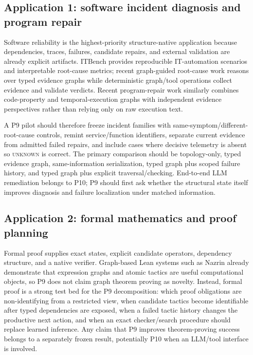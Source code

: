 \subsection{Application 1: software incident diagnosis and program repair}

Software reliability is the highest-priority structure-native application because dependencies, traces, failures, candidate repairs, and external validation are already explicit artifacts. ITBench provides reproducible IT-automation scenarios and interpretable root-cause metrics; recent graph-guided root-cause work reasons over typed evidence graphs while deterministic graph/tool operations collect evidence and validate verdicts. Recent program-repair work similarly combines code-property and temporal-execution graphs with independent evidence perspectives rather than relying only on raw execution text.

A P9 pilot should therefore freeze incident families with same-symptom/different-root-cause controls, remint service/function identifiers, separate current evidence from admitted failed repairs, and include cases where decisive telemetry is absent so \textsc{unknown} is correct. The primary comparison should be topology-only, typed evidence graph, same-information serialization, typed graph plus scoped failure history, and typed graph plus explicit traversal/checking. End-to-end LLM remediation belongs to P10; P9 should first ask whether the structural state itself improves diagnosis and failure localization under matched information.

\subsection{Application 2: formal mathematics and proof planning}

Formal proof supplies exact states, explicit candidate operators, dependency structure, and a native verifier. Graph-based Lean systems such as Nazrin already demonstrate that expression graphs and atomic tactics are useful computational objects, so P9 does not claim graph theorem proving as novelty. Instead, formal proof is a strong test bed for the P9 decomposition: which proof obligations are non-identifying from a restricted view, when candidate tactics become identifiable after typed dependencies are exposed, when a failed tactic history changes the productive next action, and when an exact checker/search procedure should replace learned inference. Any claim that P9 improves theorem-proving success belongs to a separately frozen result, potentially P10 when an LLM/tool interface is involved.

